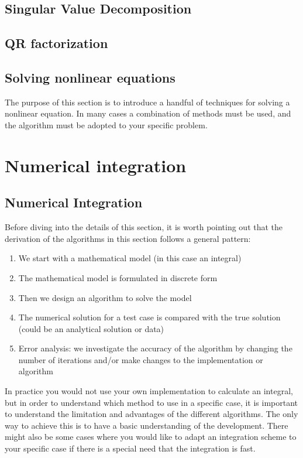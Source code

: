 \documentclass[graybox,sectrefs,envcountresetchap,open=right,final]{svmonodo}
\begin{document}
\section{Singular Value Decomposition}

\section{QR factorization}

\section{Solving nonlinear equations}
The purpose of this section is to introduce a handful of techniques for solving a nonlinear equation. In many cases a combination of methods must be used, and the algorithm must be adopted to your specific problem. 
\chapter{Numerical integration}
\label{ch:numint}



\section{Numerical Integration}
Before diving into the details of this section, it is worth pointing out that the derivation of the algorithms in this section follows a general pattern:

\begin{enumerate}
\item We start with a mathematical model (in this case an integral)

\item The mathematical model is formulated in discrete form 

\item Then we design an algorithm to solve the model 

\item The numerical solution for a test case is compared with the true solution (could be an analytical solution or data)

\item Error analysis: we investigate the accuracy of the algorithm by changing the number of iterations and/or make changes to the implementation or algorithm
\end{enumerate}

\noindent
In practice you would not use your own implementation to calculate an integral, but in order to understand which method to use 
in a specific case, it is important to understand the limitation and advantages of the different algorithms. The only way to achieve this is to 
have a basic understanding of the development. There might also be some cases where you would like to adapt an integration scheme to your specific
case if there is a special need  that the integration is fast. 
\end{document}
